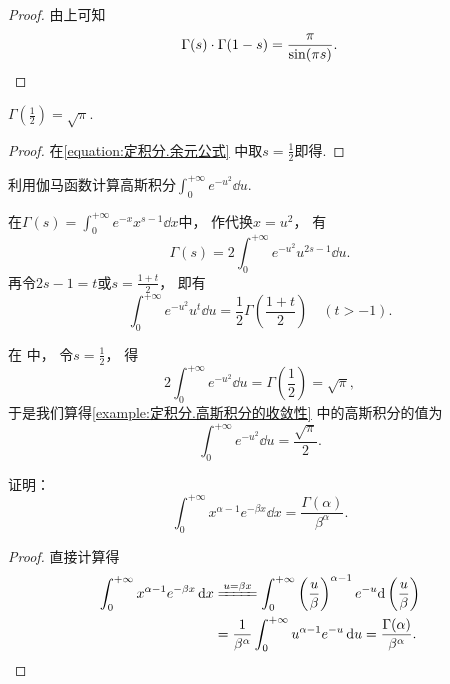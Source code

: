 \begin{property}[余元公式]
\begin{proof}
由上可知\[
	\Gamma(s) \cdot \Gamma(1-s)
	= \frac{\pi}{\sin(\pi s)}.
	\qedhere
\]
\end{proof}
\end{property}

\begin{corollary}
\(\Gamma\left(\frac{1}{2}\right) = \sqrt{\pi}\).
\begin{proof}
在\cref{equation:定积分.余元公式} 中取\(s = \frac12\)即得.
\end{proof}
\end{corollary}

\begin{example}\label{example:反常积分.利用伽马函数计算高斯积分}
利用伽马函数计算高斯积分\(\int_0^{+\infty} e^{-u^2} \dd{u}\).
\begin{solution}
在\(\Gamma(s) = \int_0^{+\infty} e^{-x} x^{s-1} \dd{x}\)中，
作代换\(x = u^2\)，
有\begin{equation}\label{equation:定积分.伽马函数.中间步骤1}
	\Gamma(s) = 2 \int_0^{+\infty} e^{-u^2} u^{2s-1} \dd{u}.
\end{equation}
再令\(2s-1 = t\)或\(s = \frac{1+t}{2}\)，
即有\begin{equation}
	\int_0^{+\infty} e^{-u^2} u^t \dd{u}
	= \frac{1}{2} \Gamma\left(\frac{1+t}{2}\right)
	\quad (t > -1).
\end{equation}

在  中，
令\(s=\frac12\)，
得\[
	2\int_0^{+\infty} e^{-u^2} \dd{u}
	= \Gamma\left(\frac{1}{2}\right)
	= \sqrt{\pi},
\]
于是我们算得\cref{example:定积分.高斯积分的收敛性} 中的高斯积分的值为\begin{equation}
	\int_0^{+\infty} e^{-u^2} \dd{u} = \frac{\sqrt{\pi}}{2}.
\end{equation}
\end{solution}
\end{example}

\begin{example}
证明：\begin{equation}
	\int_0^{+\infty} x^{\alpha-1} e^{-\beta x} \dd{x}
	= \frac{\Gamma(\alpha)}{\beta^\alpha}.
\end{equation}
\begin{proof}
直接计算得
\begin{align*}
	\int_0^{+\infty} x^{\alpha-1} e^{-\beta x} \dd{x}
	&\xlongequal{u=\beta x}
		\int_0^{+\infty}
			\left(\frac{u}{\beta}\right)^{\alpha-1}
			e^{-u} \dd\left(\frac{u}{\beta}\right) \\
	&= \frac{1}{\beta^\alpha} \int_0^{+\infty} u^{\alpha-1} e^{-u} \dd{u}
	= \frac{\Gamma(\alpha)}{\beta^\alpha}.
	\qedhere
\end{align*}
\end{proof}
\end{example}


